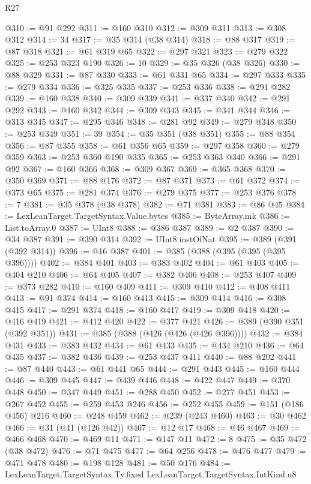 \begin{lexlean}{R27}
\begin{coremodule}
@310 := @91 @292
@311 := @160 @310
@312 := @309 @311
@313 := @308 @312
@314 := 34
@317 := @35 @314 (@38 @314)
@318 := @88 @317
@319 := @87 @318
@321 := @61 @319 @65
@322 := @297 @321
@323 := @279 @322
@325 := @253 @323 @190
@326 := 10
@329 := @35 @326 (@38 @326)
@330 := @88 @329
@331 := @87 @330
@333 := @61 @331 @65
@334 := @297 @333
@335 := @279 @334
@336 := @325 @335
@337 := @253 @336
@338 := @291 @282
@339 := @160 @338
@340 := @309 @339
@341 := @337 @340
@342 := @291 @292
@343 := @160 @342
@344 := @309 @343
@345 := @341 @344
@346 := @313 @345
@347 := @295 @346
@348 := @281 @92
@349 := @279 @348
@350 := @253 @349
@351 := 39
@354 := @35 @351 (@38 @351)
@355 := @88 @354
@356 := @87 @355
@358 := @61 @356 @65
@359 := @297 @358
@360 := @279 @359
@363 := @253 @360 @190 @335
@365 := @253 @363 @340
@366 := @291 @92
@367 := @160 @366
@368 := @309 @367
@369 := @365 @368
@370 := @350 @369
@371 := @88 @176
@372 := @87 @371
@373 := @61 @372
@374 := @373 @65
@375 := @281 @374
@376 := @279 @375
@377 := @253 @376
@378 := 7
@381 := @35 @378 (@38 @378)
@382 := @71 @381
@383 := @86 @45
@384 := LexLeanTarget.TargetSyntax.Value.bytes
@385 := ByteArray.mk
@386 := List.toArray.{0}
@387 := UInt8
@388 := @386 @387
@389 := @2 @387
@390 := @34 @387
@391 := @390 @314
@392 := UInt8.instOfNat
@395 := @389 (@391 (@392 @314))
@396 := @16 @387
@401 := @385 (@388 (@395 (@395 (@395 @396))))
@402 := @384 @401
@403 := @383 @402
@404 := @61 @403
@405 := @404 @210
@406 := @64 @405
@407 := @382 @406
@408 := @253 @407
@409 := @373 @282
@410 := @160 @409
@411 := @309 @410
@412 := @408 @411
@413 := @91 @374
@414 := @160 @413
@415 := @309 @414
@416 := @308 @415
@417 := @291 @374
@418 := @160 @417
@419 := @309 @418
@420 := @416 @419
@421 := @412 @420
@422 := @377 @421
@426 := @389 (@390 @351 (@392 @351))
@431 := @385 (@388 (@426 (@426 (@426 @396))))
@432 := @384 @431
@433 := @383 @432
@434 := @61 @433
@435 := @434 @210
@436 := @64 @435
@437 := @382 @436
@439 := @253 @437 @411
@440 := @88 @202
@441 := @87 @440
@443 := @61 @441 @65
@444 := @291 @443
@445 := @160 @444
@446 := @309 @445
@447 := @439 @446
@448 := @422 @447
@449 := @370 @448
@450 := @347 @449
@451 := @288 @450
@452 := @277 @451
@453 := @267 @452
@455 := @259 @453 @246
@456 := @252 @455
@459 := @151 (@186 @456) @216
@460 := @248 @459
@462 := @239 (@243 @460)
@463 := @30 @462
@466 := @31 (@41 (@126 @42))
@467 := @12 @17
@468 := @46 @467
@469 := @466 @468
@470 := @469 @11
@471 := @147 @11
@472 := 8
@475 := @35 @472 (@38 @472)
@476 := @71 @475
@477 := @64 @256
@478 := @476 @477
@479 := @471 @478
@480 := @198 @128
@481 := @50 @176
@484 := LexLeanTarget.TargetSyntax.Ty.fixed LexLeanTarget.TargetSyntax.IntKind.u8

\end{coremodule}
\end{lexlean}
